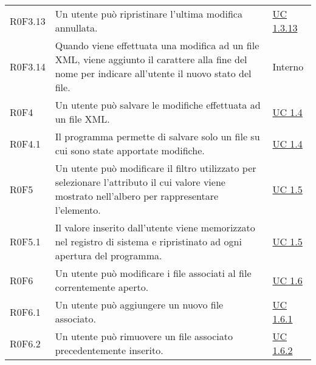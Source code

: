 \begin{center}
\begin{longtable}{p{4.2cm}!{\color{white}\vrule width 0.5mm}p{6cm}!{\color{white}\vrule width 0.5mm}p{2.5cm}!{\color{white}\vrule width 0.5mm}}
			\hspace{2mm}\hypertarget{XER0F3.13}{R0F3.13} & Un utente può ripristinare l'ultima modifica annullata. & \hyperref[subsec:XEUC1.3.13]{UC 1.3.13}\\
	
	
	
			\hspace{2mm}\hypertarget{R0F3.14}{R0F3.14} & Quando viene effettuata una modifica ad un file XML, viene aggiunto il carattere \sq{*} alla fine del nome per indicare all'utente il nuovo stato del file. & Interno\\
		
		
		\hspace{0mm}\hypertarget{XER0F4}{R0F4} & Un utente può salvare le modifiche effettuata ad un file XML. & \hyperref[subsec:XEUC1.4]{UC 1.4}\\
		
			\hspace{0mm}\hypertarget{XER0F4.1}{R0F4.1} & Il programma permette di salvare solo un file su cui sono state apportate modifiche. & \hyperref[subsec:XEUC1.4]{UC 1.4}\\
		
		\hspace{0mm}\hypertarget{XER0F5}{R0F5} & Un utente può modificare il filtro utilizzato per selezionare l'attributo il cui valore viene mostrato nell'albero per rappresentare l'elemento. & \hyperref[subsec:XEUC1.5]{UC 1.5}\\
			
			\hspace{0mm}\hypertarget{XER0F5.1}{R0F5.1} & Il valore inserito dall'utente viene memorizzato nel registro di sistema e ripristinato ad ogni apertura del programma. & \hyperref[subsec:XEUC1.5]{UC 1.5}\\
			
		\hspace{0mm}\hypertarget{XER0F6}{R0F6} & Un utente può modificare i file associati al file correntemente aperto. & \hyperref[subsec:XEUC1.6]{UC 1.6}\\
			
			\hspace{2mm}\hypertarget{XER0F6.1}{R0F6.1} & Un utente può aggiungere un nuovo file associato. & \hyperref[subsec:XEUC1.6.1]{UC 1.6.1}\\
				
			\hspace{2mm}\hypertarget{XER0F6.2}{R0F6.2} & Un utente può rimuovere un file associato precedentemente inserito. & \hyperref[subsec:XEUC1.6.2]{UC 1.6.2}\\
		

\end{longtable}
\end{center}
